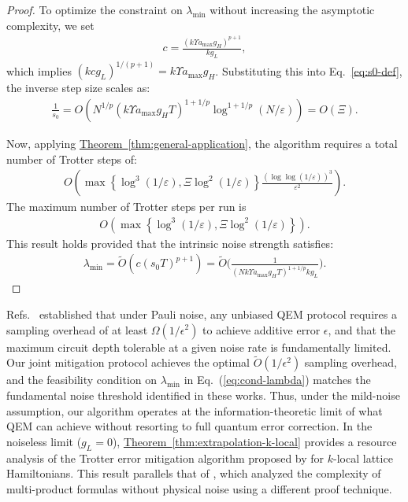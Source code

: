 \documentclass[aps,pra,reprint,groupedaddress,floatfix]{revtex4-2}
\newcommand{\thm}[1]{\hyperref[thm:#1]{Theorem~\ref*{thm:#1}}}
\newcommand{\eps}{\varepsilon}
\begin{document}
\begin{proof}
    To optimize the constraint on $\lambda_{\min}$ without increasing the asymptotic complexity, we set
    \begin{align}
    \label{eq:def-c}
        c = \frac{(k\Upsilon a_{\max}g_H)^{p+1}}{kg_L},
    \end{align}
    which implies $(kcg_L)^{1/(p+1)} = k\Upsilon a_{\max}g_H$. Substituting this into Eq.~\eqref{eq:s0-def}, the inverse step size scales as:
    \begin{align*}
        \frac{1}{s_0} = O\left( N^{1/p}(k\Upsilon a_{\max} g_H T)^{1+1/p} \log^{1+1/p}(N/\eps) \right) = O(\Xi).
    \end{align*}

    Now, applying \thm{general-application}, the algorithm requires a total number of Trotter steps of:
    \begin{align*}
         O\left( \max\left\{\log^3(1/\eps), \Xi \log^2(1/\eps)\right\} \frac{(\log\log (1/\eps))^3}{\eps^2} \right).
    \end{align*}
    The maximum number of Trotter steps per run is
    \begin{align*}
  O\left( \max\left\{\log^3(1/\eps), \Xi \log^2(1/\eps)\right\} \right).
    \end{align*}
    This result holds provided that the intrinsic noise strength satisfies:
    \begin{align*}
        \lambda_{\min} = \widetilde{O}(c(s_0T)^{p+1}) = \widetilde{O}\Big(\frac{1}{ (Nk\Upsilon a_{\max}g_HT)^{1+1/p} kg_L }\Big).
    \end{align*}
\end{proof}

Refs.~\cite{wang2021noise, cai2021multi} established that under Pauli noise, any unbiased QEM protocol requires a sampling overhead of at least $\Omega(1/\epsilon^2)$ to achieve additive error $\epsilon$, and that the maximum circuit depth tolerable at a given noise rate is fundamentally limited. Our joint mitigation protocol achieves the optimal $\widetilde{O}(1/\epsilon^2)$ sampling overhead, and the feasibility condition on $\lambda_{\min}$ in Eq.~(\ref{eq:cond-lambda}) matches the fundamental noise threshold identified in these works. Thus, under the mild-noise assumption, our algorithm operates at the information-theoretic limit of what QEM can achieve without resorting to full quantum error correction.
In the noiseless limit ($g_L = 0$), \thm{extrapolation-k-local} provides a resource analysis of the Trotter error mitigation algorithm proposed by \citet{watson2025exponentially} for $k$-local lattice Hamiltonians. This result parallels that of \citet{mizuta2025commutator}, which analyzed the complexity of multi-product formulas without physical noise using a different proof technique.
\end{document}
